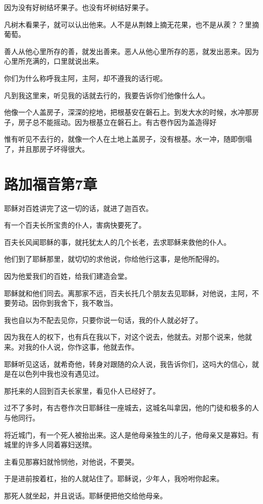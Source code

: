 \documentclass[12pt,oneside]{book}
\begin{document}
因为没有好树结坏果子。也没有坏树结好果子。

凡树木看果子，就可以认出他来。人不是从荆棘上摘无花果，也不是从蒺？？里摘葡萄。

善人从他心里所存的善，就发出善来。恶人从他心里所存的恶，就发出恶来。因为心里所充满的，口里就说出来。

你们为什么称呼我主阿，主阿，却不遵我的话行呢。

凡到我这里来，听见我的话就去行的，我要告诉你们他像什么人。

他像一个人盖房子，深深的挖地，把根基安在磐石上。到发大水的时候，水冲那房子，房子总不能摇动。因为根基立在磐石上。有古卷作因为盖造得好

惟有听见不去行的，就像一个人在土地上盖房子，没有根基。水一冲，随即倒塌了，并且那房子坏得很大。

\chapter{路加福音第7章}
耶稣对百姓讲完了这一切的话，就进了迦百农。

有一个百夫长所宝贵的仆人，害病快要死了。

百夫长风闻耶稣的事，就托犹太人的几个长老，去求耶稣来救他的仆人。

他们到了耶稣那里，就切切的求他说，你给他行这事，是他所配得的。

因为他爱我们的百姓，给我们建造会堂。

耶稣就和他们同去。离那家不远，百夫长托几个朋友去见耶稣，对他说，主阿，不要劳动。因你到我舍下，我不敢当。

我也自以为不配去见你，只要你说一句话，我的仆人就必好了。

因为我在人的权下，也有兵在我以下，对这个说去，他就去。对那个说来，他就来。对我的仆人说，你作这事，他就去作。

耶稣听见这话，就希奇他，转身对跟随的众人说，我告诉你们，这吗大的信心，就是在以色列中我也没有遇见过。

那托来的人回到百夫长家里，看见仆人已经好了。

过不了多时，有古卷作次日耶稣往一座城去，这城名叫拿因，他的门徒和极多的人与他同行。

将近城门，有一个死人被抬出来。这人是他母亲独生的儿子，他母亲又是寡妇。有城里的许多人同着寡妇送殡。

主看见那寡妇就怜悯他，对他说，不要哭。

于是进前按着杠，抬的人就站住了。耶稣说，少年人，我吩咐你起来。

那死人就坐起，并且说话。耶稣便把他交给他母亲。
\end{document}
